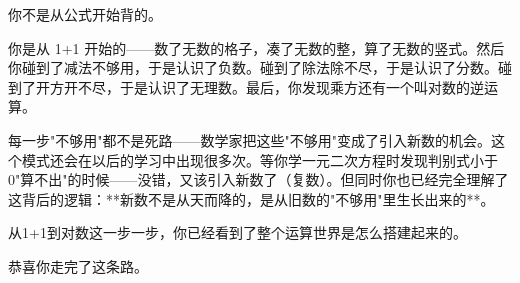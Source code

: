 
你不是从公式开始背的。

你是从 1+1 开始的——数了无数的格子，凑了无数的整，算了无数的竖式。然后你碰到了减法不够用，于是认识了负数。碰到了除法除不尽，于是认识了分数。碰到了开方开不尽，于是认识了无理数。最后，你发现乘方还有一个叫对数的逆运算。

每一步"不够用"都不是死路——数学家把这些"不够用"变成了引入新数的机会。这个模式还会在以后的学习中出现很多次。等你学一元二次方程时发现判别式小于0"算不出"的时候——没错，又该引入新数了（复数）。但同时你也已经完全理解了这背后的逻辑：**新数不是从天而降的，是从旧数的"不够用"里生长出来的**。

从1+1到对数这一步一步，你已经看到了整个运算世界是怎么搭建起来的。

恭喜你走完了这条路。
